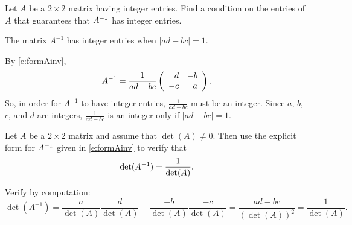 \documentclass{ximera}
\begin{document}
\begin{exercise} \label{c4.9.5}
Let $A$ be a $2\times 2$ matrix having integer entries.  Find a
condition on the entries of $A$ that guarantees that $A^{-1}$ has
integer entries.

\begin{solution}

\ans The matrix $A^{-1}$ has integer entries when $|ad - bc| = 1$.

\soln By \eqref{e:formAinv},
\[
A^{-1} = \frac{1}{ad-bc}\left(\begin{array}{rr} d & -b\\ -c &a\end{array}\right).
\]
So, in order for $A^{-1}$ to have integer entries, $\frac{1}{ad-bc}$
must be an integer.  Since $a$, $b$, $c$, and $d$ are integers,
$\frac{1}{ad - bc}$ is an integer only if $|ad - bc| = 1$.


\end{solution}
\end{exercise}

\begin{exercise} \label{c6.4.4}
Let $A$ be a $2\times 2$ matrix and assume that $\det(A)\neq 0$.
Then use the explicit form for $A^{-1}$ given in \eqref{e:formAinv}
to verify that
\[
\det(A^{-1}) = \frac{1}{\det(A)}.
\]

\begin{solution}

Verify by computation:
\[ \det(A^{-1}) = \frac{a}{\det(A)}\frac{d}{\det(A)} -
\frac{-b}{\det(A)}\frac{-c}{\det(A)} = \frac{ad - bc}{(\det(A))^2} =
\frac{1}{\det(A)}. \]

\end{solution}
\end{exercise}
\end{document}
